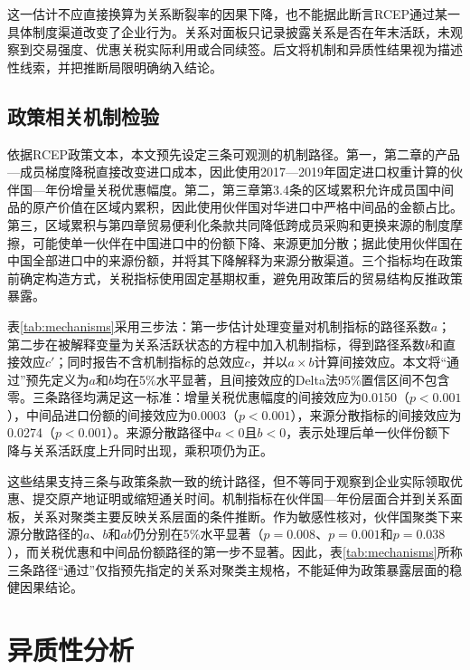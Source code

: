 \documentclass[12pt,a4paper]{ctexart}
\begin{document}
这一估计不应直接换算为关系断裂率的因果下降，也不能据此断言RCEP通过某一具体制度渠道改变了企业行为。关系对面板只记录披露关系是否在年末活跃，未观察到交易强度、优惠关税实际利用或合同续签。后文将机制和异质性结果视为描述性线索，并把推断局限明确纳入结论。

\subsection{政策相关机制检验}

依据RCEP政策文本，本文预先设定三条可观测的机制路径。第一，第二章的产品—成员梯度降税直接改变进口成本，因此使用2017—2019年固定进口权重计算的伙伴国—年份增量关税优惠幅度。第二，第三章第3.4条的区域累积允许成员国中间品的原产价值在区域内累积，因此使用伙伴国对华进口中严格中间品的金额占比。第三，区域累积与第四章贸易便利化条款共同降低跨成员采购和更换来源的制度摩擦，可能使单一伙伴在中国进口中的份额下降、来源更加分散；据此使用伙伴国在中国全部进口中的来源份额，并将其下降解释为来源分散渠道。三个指标均在政策前确定构造方式，关税指标使用固定基期权重，避免用政策后的贸易结构反推政策暴露。

表\ref{tab:mechanisms}采用三步法：第一步估计处理变量对机制指标的路径系数$a$；第二步在被解释变量为关系活跃状态的方程中加入机制指标，得到路径系数$b$和直接效应$c'$；同时报告不含机制指标的总效应$c$，并以$a\times b$计算间接效应。本文将“通过”预先定义为$a$和$b$均在5\%水平显著，且间接效应的Delta法95\%置信区间不包含零。三条路径均满足这一标准：增量关税优惠幅度的间接效应为0.0150（$p<0.001$），中间品进口份额的间接效应为0.0003（$p<0.001$），来源分散指标的间接效应为0.0274（$p<0.001$）。来源分散路径中$a<0$且$b<0$，表示处理后单一伙伴份额下降与关系活跃度上升同时出现，乘积项仍为正。

这些结果支持三条与政策条款一致的统计路径，但不等同于观察到企业实际领取优惠、提交原产地证明或缩短通关时间。机制指标在伙伴国—年份层面合并到关系面板，关系对聚类主要反映关系层面的条件推断。作为敏感性核对，伙伴国聚类下来源分散路径的$a$、$b$和$ab$仍分别在5\%水平显著（$p=0.008$、$p=0.001$和$p=0.038$），而关税优惠和中间品份额路径的第一步不显著。因此，表\ref{tab:mechanisms}所称三条路径“通过”仅指预先指定的关系对聚类主规格，不能延伸为政策暴露层面的稳健因果结论。



\section{异质性分析}
\end{document}
